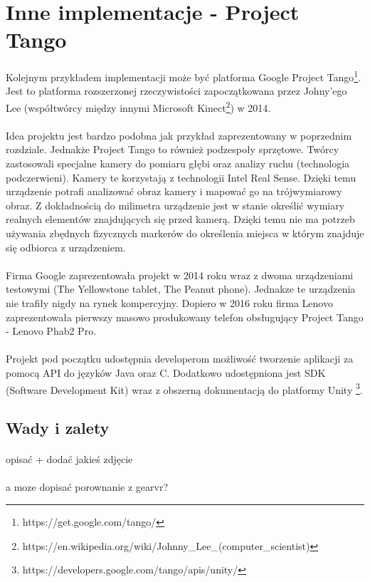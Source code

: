 \newpage
\section{Inne implementacje - Project Tango}
\paragraph{}
Kolejnym przykładem implementacji może być platforma Google Project Tango\footnote{https://get.google.com/tango/}. Jest to platforma rozszerzonej rzeczywistości zapoczątkowana przez Johny'ego Lee (współtwórcy między innymi Microsoft Kinect\footnote{https://en.wikipedia.org/wiki/Johnny\_Lee\_(computer\_scientist)}) w 2014. 
\paragraph{}
Idea projektu jest bardzo podobna jak przykład zaprezentowany w poprzednim rozdziale. Jednakże Project Tango to również podzespoły sprzętowe. Twórcy zastosowali specjalne kamery do pomiaru głębi oraz analizy ruchu (technologia podczerwieni). Kamery te korzystają z technologii Intel Real Sense. Dzięki temu urządzenie potrafi analizować obraz kamery i mapować go na trójwymiarowy obraz. Z dokładnością do milimetra urządzenie jest w stanie określić wymiary realnych elementów znajdujących się przed kamerą. Dzięki temu nie ma potrzeb używania zbędnych fizycznych markerów do określenia miejsca w którym znajduje się odbiorca z urządzeniem.
\paragraph{}
Firma Google zaprezentowała projekt w 2014 roku wraz z dwoma urządzeniami testowymi (The Yellowstone tablet,  The Peanut phone). Jednakze te urządzenia nie trafiły nigdy na rynek kompercyjny. Dopiero w 2016 roku firma Lenovo zaprezentowała pierwszy masowo produkowany telefon obsługujący Project Tango - Lenovo Phab2 Pro.
\paragraph{}
Projekt pod początku udostępnia developerom możliwość tworzenie aplikacji za pomocą API do języków Java oraz C. Dodatkowo udostępniona jest SDK (Software Development Kit) wraz z obszerną dokumentacją do platformy Unity \footnote{https://developers.google.com/tango/apis/unity/}.

\subsection{Wady i zalety}
\paragraph{}
{\color{red} opisać + dodać jakieś zdjęcie}

\paragraph{}
{\color{red}a moze dopisać porownanie z gearvr?}
